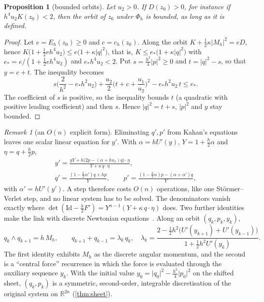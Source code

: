 \documentclass[11pt,a4paper]{article}
\newtheorem{proposition}[theorem]{Proposition}
\theoremstyle{definition}
\theoremstyle{remark}
\newtheorem{remark}[theorem]{Remark}
\newcommand{\R}{\mathbb{R}}
\newcommand{\Id}{\mathrm{Id}}
\begin{document}
\begin{proposition}[bounded orbits]\label{prop:bounded}
Let $u_2>0$. If $D(z_0)>0$, for instance if $h^4u_2K(z_0)<2$, then the orbit of $z_0$ under $\Phi_h$ is bounded,
as long as it is defined.
\end{proposition}

\begin{proof}
Let $e=E_h(z_0)\ge0$ and $c=c_h(z_0)$. Along the orbit $K+\frac12\kappa\lvert M_h\rvert^2=eD$, hence
$K\big(1+\frac12eh^4u_2\big)\le e\big(1+\kappa\lvert q\rvert^2\big)$, that is,
$K\le e_*\big(1+\kappa\lvert q\rvert^2\big)$ with $e_*=e/(1+\frac12eh^4u_2)$ and $e_*h^4u_2<2$. Put
$s=\frac{h^2}{4}\lvert p\rvert^2\ge0$ and $t=\lvert q\rvert^2-s$, so that $y=c+t$. The inequality becomes
\[
s\Big(\frac{2}{h^2}-e_*h^2u_2\Big)+\frac{u_2}{2}\Big(t+c+\frac{u_1}{u_2}\Big)^2-e_*h^2u_2\,t\le e_* .
\]
The coefficient of $s$ is positive, so the inequality bounds $t$ (a quadratic with positive leading coefficient)
and then $s$. Hence $\lvert q\rvert^2=t+s$, $\lvert p\rvert^2$ and $y$ stay bounded.
\end{proof}

\begin{remark}[an $O(n)$ explicit form]\label{rem:explicit}
Eliminating $q',p'$ from Kahan's equations leaves one scalar linear equation for $y'$. With
$\alpha=hU'(y)$, $Y=1+\frac h2\alpha$ and $\eta=q+\frac h2p$,
\begin{gather*}
y'=\frac{yY+h\big(2p-(\alpha+hu_1)q\big)\cdot\eta}{Y+\kappa\,q\cdot\eta},\\
q'=\frac{(1-\frac h2\alpha')q+hp}{Y},\qquad
p'=\frac{(1-\frac h2\alpha)p-(\alpha+\alpha')q}{Y},
\end{gather*}
with $\alpha'=hU'(y')$. A step therefore costs $O(n)$ operations, like one St\"ormer--Verlet step, and no
linear system has to be solved. The denominators vanish exactly where
$\det(\Id-\frac h2F')=Y^{n-1}(Y+\kappa\,q\cdot\eta)$ does. Two further identities make the link with
discrete Newtonian equations~\cite{Suris03}. Along an orbit $(q_k,p_k,y_k)$,
\[
q_k\wedge q_{k+1}=h\,M_h,\qquad q_{k+1}+q_{k-1}=\lambda_k\,q_k,\quad
\lambda_k=\frac{2-\frac12h^2\big(U'(y_{k+1})+U'(y_{k-1})\big)}{1+\frac12h^2U'(y_k)} .
\]
The first identity exhibits $M_h$ as the discrete angular momentum, and the second is a ``central force''
recurrence in which the force is evaluated through the auxiliary sequence $y_k$. With the initial value
$y_0=\lvert q_0\rvert^2-\frac{h^2}4\lvert p_0\rvert^2$ on the shifted sheet, $(q_k,p_k)$ is a symmetric,
second-order, integrable discretisation of the original system on $\R^{2n}$ (\cref{thm:sheet}).
\end{remark}
\end{document}
